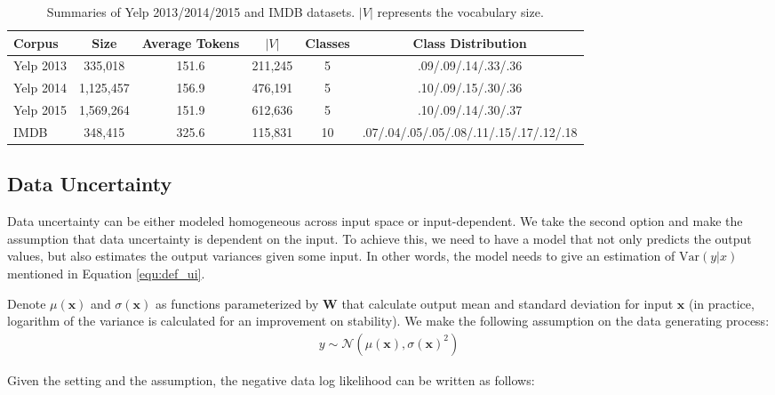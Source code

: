 \documentclass[letterpaper]{article} %
\newcommand{\vect}[1]{\mathbf{#1}}
\newcommand{\matr}[1]{\mathbf{#1}}
\newcommand{\vx}[0]{\vect{x}}
\newcommand{\N}{\mathcal{N}}
\newcommand{\mW}[0]{\matr{W}}
\newcommand{\william}[1]{\textcolor{blue}{[William: #1]}}
\begin{document}
\begin{table}[t!]
\begin{center}
\begin{tabular}{lccccc}
\hline
{\bf Corpus} & \bf Size & \bf Average Tokens & $|V|$ & \bf Classes & \bf Class Distribution\\ 
\hline
Yelp 2013 & 335,018   & 151.6 & 211,245 & 5 & .09/.09/.14/.33/.36 \\
Yelp 2014 & 1,125,457 & 156.9 & 476,191 & 5 & .10/.09/.15/.30/.36 \\
Yelp 2015 & 1,569,264 & 151.9 & 612,636 & 5 & .10/.09/.14/.30/.37\\
IMDB & 348,415 & 325.6 & 115,831 & 10 & .07/.04/.05/.05/.08/.11/.15/.17/.12/.18\\ 

\hline
\end{tabular}
\end{center}
\caption{\label{tab:sent_datasets} Summaries of Yelp 2013/2014/2015 and IMDB datasets. $|V|$ represents the vocabulary size.}
\end{table}

\subsection{Data Uncertainty}
\label{sec:input_uncertainty}
Data uncertainty can be either modeled homogeneous across input space or input-dependent. We take the second option and make the assumption that data uncertainty is dependent on the input. To achieve this, we need to have a model that not only predicts the output values, but also estimates the output variances given some input. In other words, the model needs to give an estimation of $\text{Var}(y|x)$ mentioned in Equation \ref{equ:def_ui}.

Denote $\mu(\vx)$ and $\sigma(\vx)$ as functions parameterized by $\mW$ that calculate output mean and standard deviation for input $\vx$ (in practice, logarithm of the variance is calculated for an improvement on stability). We make the following assumption on the data generating process:
\begin{align}
y\sim\N\left(\mu(\vx), \sigma(\vx)^2\right)
\end{align}

Given the setting and the assumption, the negative data log likelihood can be written as follows:
\end{document}
